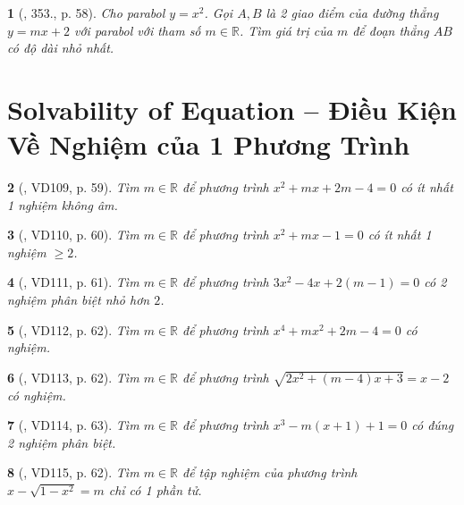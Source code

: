 \documentclass{article}
\newtheorem{baitoan}{}
\begin{document}
\begin{baitoan}[\cite{Binh_Toan_9_tap_2}, 353., p. 58]
	Cho parabol $y = x^2$. Gọi $A,B$ là 2 giao điểm của đường thẳng $y = mx + 2$ với parabol với tham số $m\in\mathbb{R}$. Tìm giá trị của $m$ để đoạn thẳng $AB$ có độ dài nhỏ nhất.
\end{baitoan}


\section{Solvability of Equation -- Điều Kiện Về Nghiệm của 1 Phương Trình}

\begin{baitoan}[\cite{Binh_Toan_9_tap_2}, VD109, p. 59]
	Tìm $m\in\mathbb{R}$ để phương trình $x^2 + mx + 2m - 4 = 0$ có ít nhất 1 nghiệm không âm.
\end{baitoan}

\begin{baitoan}[\cite{Binh_Toan_9_tap_2}, VD110, p. 60]
	Tìm $m\in\mathbb{R}$ để phương trình $x^2 + mx - 1 = 0$ có ít nhất 1 nghiệm $\ge2$.
\end{baitoan}

\begin{baitoan}[\cite{Binh_Toan_9_tap_2}, VD111, p. 61]
	Tìm $m\in\mathbb{R}$ để phương trình $3x^2 - 4x + 2(m - 1) = 0$ có 2 nghiệm phân biệt nhỏ hơn $2$.
\end{baitoan}

\begin{baitoan}[\cite{Binh_Toan_9_tap_2}, VD112, p. 62]
	Tìm $m\in\mathbb{R}$ để phương trình $x^4 + mx^2 + 2m - 4 = 0$ có nghiệm.
\end{baitoan}

\begin{baitoan}[\cite{Binh_Toan_9_tap_2}, VD113, p. 62]
	Tìm $m\in\mathbb{R}$ để phương trình $\sqrt{2x^2 + (m - 4)x + 3} = x - 2$ có nghiệm.
\end{baitoan}

\begin{baitoan}[\cite{Binh_Toan_9_tap_2}, VD114, p. 63]
	Tìm $m\in\mathbb{R}$ để phương trình $x^3 - m(x + 1) + 1 = 0$ có đúng 2 nghiệm phân biệt.
\end{baitoan}

\begin{baitoan}[\cite{Binh_Toan_9_tap_2}, VD115, p. 62]
	Tìm $m\in\mathbb{R}$ để tập nghiệm của phương trình $x - \sqrt{1 - x^2} = m$ chỉ có 1 phần tử.
\end{baitoan}
\end{document}
